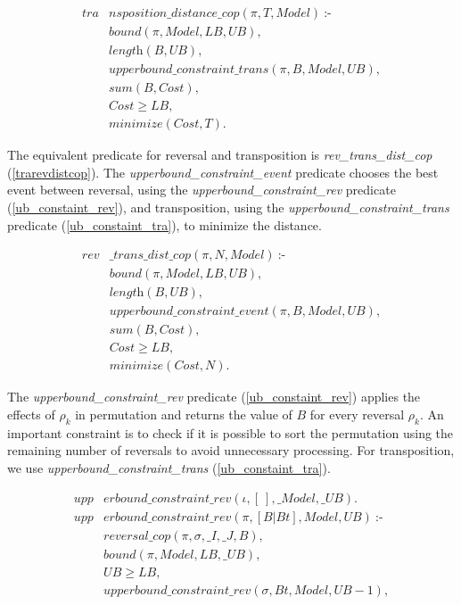 \begin{align}
  \label{tradistance_cop}
  \textit{tra}&\textit{nsposition\_distance\_cop}(\pi, T, Model)~\text{:-} \nonumber\\
  &\textit{bound}(\pi, Model, LB, UB), \nonumber\\
  &\textit{length}(B, UB), \nonumber \\
  &\textit{upperbound\_constraint\_trans}(\pi, B, Model, UB), \\
  &\textit{sum}(B, Cost), \nonumber \\
  &\textit{Cost} \ge \textit{LB}, \nonumber \\
  &\textit{minimize}(Cost, T). \nonumber
\end{align}

The equivalent predicate for reversal and transposition is
\textit{rev\_trans\_dist\_cop} (\ref{trarevdistcop}). The
\textit{upperbound\_constraint\_event} predicate chooses the best
event between reversal, using the \textit{upperbound\_constraint\_rev}
predicate (\ref{ub_constaint_rev}), and transposition, using the
\textit{upperbound\_constraint\_trans} predicate
(\ref{ub_constaint_tra}), to minimize the distance.

\begin{align}
  \label{trarevdistcop}
  \textit{rev}&\textit{\_trans\_dist\_cop}(\pi, N, Model)~\text{:-} \nonumber\\
  &\textit{bound}(\pi, Model, LB, UB), \nonumber\\
  &\textit{length}(B, UB), \nonumber \\
  &\textit{upperbound\_constraint\_event}(\pi, B, Model, UB), \\
  &\textit{sum}(B, Cost), \nonumber \\
  &\textit{Cost} \ge \textit{LB}, \nonumber \\
  &\textit{minimize}(Cost, N). \nonumber
\end{align}

The \textit{upperbound\_constraint\_rev} predicate
(\ref{ub_constaint_rev}) applies the effects of $\rho_{k}$ in
permutation and returns the value of $B$ for every reversal
$\rho_{k}$. An important constraint is to check if it is possible to
sort the permutation using the remaining number of reversals to avoid
unnecessary processing. For transposition, we use
\textit{upperbound\_constraint\_trans} (\ref{ub_constaint_tra}).

\begin{align}
  \label{ub_constaint_rev}
  \textit{upp}&\textit{erbound\_constraint\_rev}(\iota, [~], \_Model, \_UB). \nonumber\\
  \textit{upp}&\textit{erbound\_constraint\_rev}(\pi, [B|Bt], Model, UB)~\text{:-} \nonumber\\
  &\textit{reversal\_cop}(\pi, \sigma, \_I, \_J, B), \\
  &\textit{bound}(\pi, Model, LB, \_UB), \nonumber\\
  &UB \ge LB, \nonumber \\
  &\textit{upperbound\_constraint\_rev}(\sigma, Bt, Model, UB - 1), \nonumber 
\end{align}

